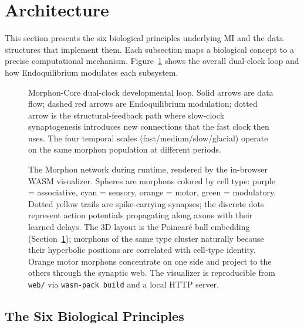 \section{Architecture}
\label{sec:architecture}

This section presents the six biological principles underlying MI and the data structures that implement them. Each subsection maps a biological concept to a precise computational mechanism. Figure~\ref{fig:architecture} shows the overall dual-clock loop and how Endoquilibrium modulates each subsystem.

\begin{figure}[h]
  \centering
  \caption{Morphon-Core dual-clock developmental loop. Solid arrows are data flow; dashed red arrows are Endoquilibrium modulation; dotted arrow is the structural-feedback path where slow-clock synaptogenesis introduces new connections that the fast clock then uses. The four temporal scales (fast/medium/slow/glacial) operate on the same morphon population at different periods.}
  \label{fig:architecture}
\end{figure}

\begin{figure}[h]
  \centering
  \caption{The Morphon network during runtime, rendered by the in-browser WASM visualizer. Spheres are morphons colored by cell type: purple = associative, cyan = sensory, orange = motor, green = modulatory. Dotted yellow trails are spike-carrying synapses; the discrete dots represent action potentials propagating along axons with their learned delays. The 3D layout is the Poincar\'e ball embedding (Section~\ref{sec:architecture}); morphons of the same type cluster naturally because their hyperbolic positions are correlated with cell-type identity. Orange motor morphons concentrate on one side and project to the others through the synaptic web. The visualizer is reproducible from \texttt{web/} via \texttt{wasm-pack build} and a local HTTP server.}
  \label{fig:topology}
\end{figure}

\subsection{The Six Biological Principles}


